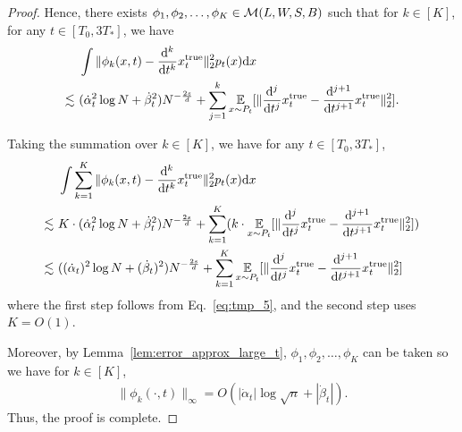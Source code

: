 \begin{proof}
     Hence, there exists $\phi_1, \phi_2, \ldots, \phi_K \in {\cal M}(L,W,S,B)$ such that for $k \in [K]$, for any $t \in [T_0, 3T_*]$, we have
    \begin{align}
    &~ \int \|\phi_k(x, t) - \frac{\mathrm{d}^k}{\mathrm{d} t^k}{x}_t^\mathrm{true}\|^2_2 p_t(x) \mathrm{d} x \notag \\
    \lesssim &~ 
    (\dot{\alpha}_t^2 \log N + \dot{\beta}_t^2 ) N^{- \frac{2s}{d}} +
    \sum_{j=1}^{k}\operatorname*{{\mathbb{E}}}_{x \sim P_t}[\|\frac{\mathrm{d}^{j}}{\mathrm{d} t^{j}}x_t^\mathrm{true} - \frac{\mathrm{d}^{j+1}}{\mathrm{d} t^{j+1}}x_t^\mathrm{true}\|_2^2]. \label{eq:tmp_5}
    \end{align}

    Taking the summation over $k \in [K]$, we have for any $t \in [T_0, 3T_*]$,
    \begin{align*}
        &~ \int \sum_{k=1}^K \|\phi_k(x, t) - \frac{\mathrm{d}^k}{\mathrm{d} t^k}{x}_t^\mathrm{true}\|^2_2 p_t(x) \mathrm{d} x \notag \\
    \lesssim &~ 
    K \cdot (\dot{\alpha}_t^2 \log N + \dot{\beta}_t^2 ) N^{- \frac{2s}{d}} +
    \sum_{k=1}^{K} (k \cdot \operatorname*{{\mathbb{E}}}_{x \sim P_t}[\|\frac{\mathrm{d}^{j}}{\mathrm{d} t^{j}}x_t^\mathrm{true} - \frac{\mathrm{d}^{j+1}}{\mathrm{d} t^{j+1}}x_t^\mathrm{true}\|_2^2]) \\
    \lesssim &~ ((\dot{\alpha}_t)^2 \log N + (\dot{\beta}_t)^2 ) N^{- \frac{2s}{d}} +
    \sum_{k=1}^{K} \operatorname*{{\mathbb{E}}}_{x \sim P_t}[\|\frac{\mathrm{d}^{j}}{\mathrm{d} t^{j}}x_t^\mathrm{true} - \frac{\mathrm{d}^{j+1}}{\mathrm{d} t^{j+1}}x_t^\mathrm{true}\|_2^2]
    \end{align*}
    where the first step follows from Eq.~\eqref{eq:tmp_5}, and the second step uses $K=O(1)$.
    
    Moreover, by Lemma~\ref{lem:error_approx_large_t}, $\phi_1, \phi_2, \ldots, \phi_K$ can be taken so we have for $k \in [K]$,
    \begin{align*}
         \|\phi_k(\cdot,t) \|_\infty = O(  |\dot{\alpha}_t | \log \sqrt{n} +  |\dot{\beta}_t |).
    \end{align*}
    Thus, the proof is complete.
\end{proof}

